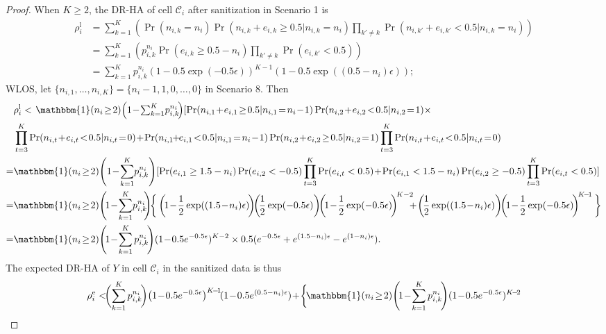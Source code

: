 \documentclass[10pt,journal,compsoc]{IEEEtran}
\newcommand{\C}{\mathcal{C}}
\begin{document}
\begin{proof}
When $K\ge2$, the DR-HA of cell $\C_i$ after sanitization in Scenario 1 is
\begin{align*}
\rho^{\text{l}}_i&=\textstyle\sum_{k=1}^{K}\!\!\left(\Pr(n_{i,k}\!=\!n_i)\Pr(n_{i,k}\!+\!e_{i,k}\!\geqslant\!0.5|n_{i,k}\!=\!n_i)\!\prod_{k'\neq k}\Pr(n_{i,k'}\!+\!e_{i,k'}\!<\!0.5|n_{i,k}\!=\!n_i)\right)\\
&=\textstyle\sum_{k=1}^{K}\left(p_{i,k}^{n_i}\Pr(e_{i,k}\geqslant0.5-n_i)
\prod_{k'\neq k}\Pr(e_{i,k'}<0.5)\right)\\
&=\textstyle\sum_{k=1}^{K}p_{i,k}^{n_i}\left(1-0.5\exp(-0.5\epsilon)\right)^{K-1}\left(1-0.5\exp((0.5-n_i)\epsilon)\right);
\end{align*}
WLOS, let $\{n_{i,1},\dots,n_{i,K}\}=\{n_i-1,1,0,\dots,0\}$ in Scenario 8. Then\small
\begin{align*}
&\rho^{\text{l}}_i<\;\textstyle\!\mathbbm{1}(n_i\!\ge\!2)\!\left(1\!-\!\sum_{k=1}^{K}\!p_{i,k}^{n_i}\!\right)\![\Pr(n_{i,1}\!+\!e_{i,1}\!\geq\!0.5|n_{i,1}\!=\!n_i\!-\!1)\Pr(n_{i,2}\!+\!e_{i,2}\!<\!0.5|n_{i,2}\!=\!1)\times\\
&\prod_{t=3}^K\Pr(n_{i,t}\!+\!e_{i,t}\!<\!0.5|n_{i,t}\!=\!0)\!+\!\Pr(n_{i,1}\!\!+\!\!e_{i,1}\!<\!0.5|n_{i,1}\!=\!n_i\!-\!1)\Pr(n_{i,2}\!+\!e_{i,2}\!\geq\!0.5|n_{i,2}\!=\!1)\prod_{t=3}^K\Pr(n_{i,t}\!+\!e_{i,t}\!<\!0.5|n_{i,t}\!=\!0)\\
\textstyle=&\mathbbm{1}(n_i\!\ge\!2)\!\left(1\!-\!\sum_{k=1}^{K}\!p_{i,k}^{n_i}\right)\![\Pr(e_{i,1}\geq 1.5-n_i)\Pr(e_{i,2}<-0.5)\prod_{t=3}^K\Pr(e_{i,t}<0.5)\!+\!\Pr(e_{i,1}< 1.5-n_i)\Pr(e_{i,2}\geq-0.5)\prod_{t=3}^K\Pr(e_{i,t}<0.5)]\\
=&\mathbbm{1}(n_i\!\ge\!2)\!\left(\!1\!-\!\sum_{k=1}^{K}\!p_{i,k}^{n_i}\!\!\right)\!\!\bigg\{\left(\!1\!-\!\frac{1}{2}\exp((1.5\!-\!n_i)\epsilon)\!\right)\!\!\left(\!\frac{1}{2}\exp(-0.5\epsilon)\right)\!\!\left(\!1\!-\!\frac{1}{2}\exp(-0.5\epsilon)\!\right)^{\!K-2}\!\!\!\!+\!\left(\!\frac{1}{2}\exp((1.5\!-\!n_i)\epsilon)\right)\!\!\left(\!1\!-\!\frac{1}{2}\exp(-0.5\epsilon)\!\right)^{\!K\!-\!1}\bigg\}\\
=&\mathbbm{1}(n_i\!\ge\!2)\!\left(\!1\!-\!\sum_{k=1}^{K}p_{i,k}^{n_i}\!\right)\!(1\!-\!0.5e^{-0.5\epsilon})^{K-2}\times0.5(e^{-0.5\epsilon}+e^{(1.5-n_i)\epsilon}-e^{(1-n_i)\epsilon}).
\end{align*}
\normalsize The expected DR-HA of $Y$ in cell $\C_i$ in the sanitized data is thus
\begin{align*}
\rho^{\text{e}}_i<&\!\bigg(\!\sum_{k=1}^{K}p_{i,k}^{n_i}\!\bigg)\big(1\!-\!0.5e^{-0.5\epsilon}\big)^{K\!-\!1}\!(1\!-\!0.5e^{(0.5-n_i)\epsilon})\!+\!\bigg\{\! \mathbbm{1}(n_i\!\ge\!2)\!\left(\!1\!-\!\sum_{k=1}^{K}p_{i,k}^{n_i}\!\right)\!(1\!-\!0.5e^{-0.5\epsilon})^{K\!-\!2}\\

\end{align*}
\end{proof}
\end{document}
